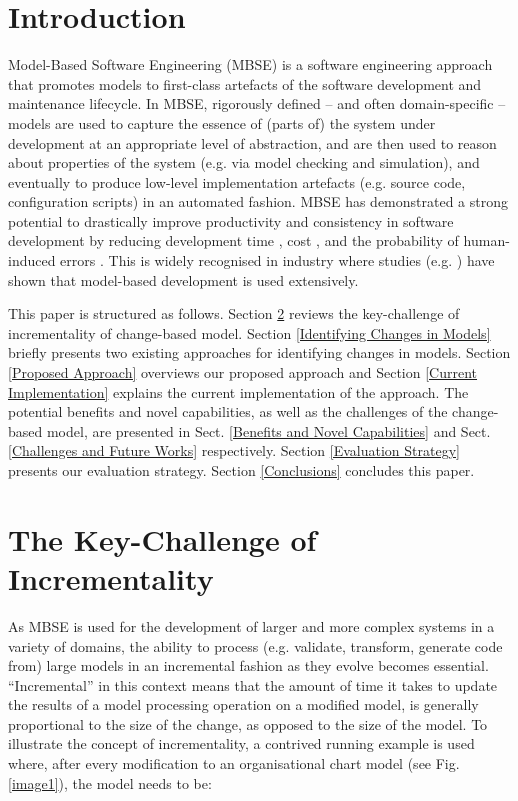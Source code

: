 \documentclass{llncs}
\begin{document}
\section{Introduction}
\label{Introduction}
Model-Based Software Engineering (MBSE) is a software engineering approach that promotes models to first-class artefacts of the software development and maintenance lifecycle. In MBSE, rigorously defined -- and often domain-specific -- models are used to capture the essence of (parts of) the system under development at an appropriate level of abstraction, and are then used to reason about properties of the system (e.g. via model checking and simulation), and eventually to produce low-level implementation artefacts (e.g. source code, configuration scripts) in an automated fashion. MBSE has demonstrated a strong potential to drastically improve productivity and consistency in software development by reducing development time \cite{jaaksi2002developing}, cost \cite{davies2014model}, and the probability of human-induced errors \cite{mohagheghi2013empirical}. This is widely recognised in industry where studies (e.g. \cite{liebel2014assessing, hutchinson2011empirical}) have shown that model-based development is used extensively.

This paper is structured as follows. Section \ref{The Key-Challenge of Incrementality} reviews the key-challenge of incrementality of change-based model. Section \ref{Identifying Changes in Models} briefly presents two existing approaches for identifying changes in models. Section \ref{Proposed Approach} overviews our proposed approach and Section \ref{Current Implementation} explains the current implementation of the approach. The potential benefits and novel capabilities, as well as the challenges of the change-based model, are presented in Sect. \ref{Benefits and Novel Capabilities} and Sect. \ref{Challenges and Future Works} respectively. Section \ref{Evaluation Strategy} presents our evaluation strategy. Section \ref{Conclusions} concludes this paper.

\section{The Key-Challenge of Incrementality}
\label{The Key-Challenge of Incrementality}
As MBSE is used for the development of larger and more complex systems in a variety of domains, the ability to process (e.g. validate, transform, generate code from) large models in an incremental fashion as they evolve becomes essential. ``Incremental'' in this context means that the amount of time it takes to update the results of a model processing operation on a modified model, is generally proportional to the size of the change, as opposed to the size of the model. To illustrate the concept of incrementality, a contrived running example is used where, after every modification to an organisational chart model (see Fig. \ref{image1}), the model needs to be:
\end{document}
